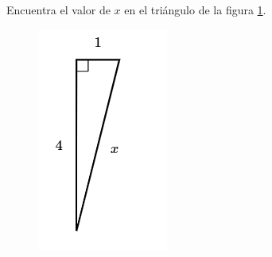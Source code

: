 Encuentra el valor de $x$ en el triángulo de la figura \ref{fig:lados_pitagoras_10}.

\begin{minipage}[t][][t]{0.3\textwidth}
    \begin{figure}[H]
        \centering
        \includegraphics[width=0.8\linewidth]{../images/lados_pitagoras_10.png}
        \caption{}
        \label{fig:lados_pitagoras_10}
    \end{figure}
\end{minipage}\hfill
